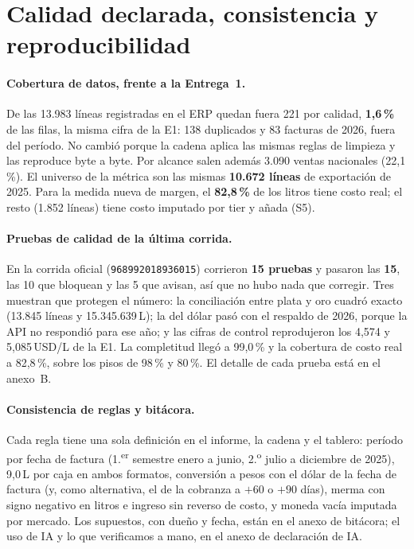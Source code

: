 
\section{Calidad declarada, consistencia y reproducibilidad}
\label{sec:calidad}

\paragraph{Cobertura de datos, frente a la Entrega~1.} De las 13.983 líneas registradas en el ERP quedan fuera 221 por calidad, \textbf{1,6\,\%} de las filas, la misma cifra de la E1: 138 duplicados y 83 facturas de 2026, fuera del período. No cambió porque la cadena aplica las mismas reglas de limpieza y las reproduce byte a byte. Por alcance salen además 3.090 ventas nacionales (22,1\,\%). El universo de la métrica son las mismas \textbf{10.672 líneas} de exportación de 2025. Para la medida nueva de margen, el \textbf{82,8\,\%} de los litros tiene costo real; el resto (1.852 líneas) tiene costo imputado por tier y añada (S5).

\paragraph{Pruebas de calidad de la última corrida.} En la corrida oficial (\texttt{968992018936015}) corrieron \textbf{15 pruebas} y pasaron las \textbf{15}, las 10 que bloquean y las 5 que avisan, así que no hubo nada que corregir. Tres muestran que protegen el número: la conciliación entre plata y oro cuadró exacto (13.845 líneas y 15.345.639\,L); la del dólar pasó con el respaldo de 2026, porque la API no respondió para ese año; y las cifras de control reprodujeron los 4,574 y 5,085\,USD/L de la E1. La completitud llegó a 99,0\,\% y la cobertura de costo real a 82,8\,\%, sobre los pisos de 98\,\% y 80\,\%. El detalle de cada prueba está en el anexo~B.

\paragraph{Consistencia de reglas y bitácora.} Cada regla tiene una sola definición en el informe, la cadena y el tablero: período por fecha de factura (1.\textsuperscript{er} semestre enero a junio, 2.\textsuperscript{o} julio a diciembre de 2025), 9,0\,L por caja en ambos formatos, conversión a pesos con el dólar de la fecha de factura (y, como alternativa, el de la cobranza a $+60$ o $+90$ días), merma con signo negativo en litros e ingreso sin reverso de costo, y moneda vacía imputada por mercado. Los supuestos, con dueño y fecha, están en el anexo de bitácora; el uso de IA y lo que verificamos a mano, en el anexo de declaración de IA.
